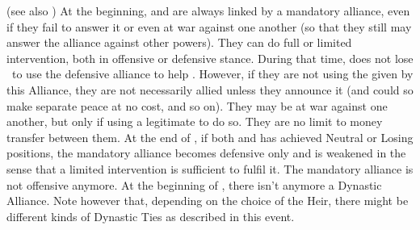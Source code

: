 (see also )
\bparag At the beginning, \SPA and \AUS are always linked by a mandatory
alliance, even if they fail to answer it or even at war against one another
(so that they still may answer the alliance against other powers).  They can
do full or limited intervention, both in offensive or defensive stance.
\bparag During that time, \SPA does not lose \STAB\ to use the defensive
alliance to help \AUS.
\bparag However, if they are not using the \CB given by this Alliance, they
are not necessarily allied unless they announce it (and could so make separate
peace at no cost, and so on).
\bparag They may be at war against one another, but only if using a legitimate
\CB to do so.
\bparag They are no limit to money transfer between them.
\bparag At the end of , if both \SPA and \AUS has achieved
Neutral or Losing positions, the mandatory alliance becomes defensive only and
is weakened in the sense that a limited intervention is sufficient to fulfil
it. The mandatory alliance is not offensive anymore.
\bparag At the beginning of , there isn't anymore a Dynastic
Alliance. Note however that, depending on the choice of the Heir, there might
be different kinds of Dynastic Ties as described in this event.



